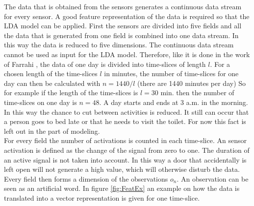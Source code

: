 The data that is obtained from the sensors generates a continuous data stream for every sensor. A good feature representation of the data is required so that the LDA model can be applied. First the sensors are divided into five fields and all the data that is generated from one field is combined into one data stream. In this way the data is reduced to five dimensions. 
The continuous data stream cannot be used as input for the LDA model. Therefore, like it is done in the work of Farrahi \cite{farrahi2008daily}, the data of one day is divided into time-slices of length $l$. For a chosen length of the time-slices $l$ in minutes, the number of time-slices for one day can then be calculated with $n=1440/l$ (there are 1440 minutes per day) So for example if the length of the time-slices is $l=30$ min. then the number of time-slices on one day is $n=48$. A day starts and ends at 3 a.m. in the morning. In this way the chance to cut between activities is reduced. It still can occur that a person goes to bed late or that he needs to visit the toilet. For now this fact is left out in the part of modeling.\\

For every field  the number of activations is counted in each time-slice. An sensor activation is defined as the change of the signal from zero  to one. The duration of an active signal is not taken into account. In this way a door that accidentally is left open will not generate a high value, which will otherwise disturb the data. Every field then forms a dimension of the observations $o_n$. An observation can be seen as an artificial word. In figure \ref{fig:FeatEx} an example on how the data is translated into a vector representation is given for one time-slice.\\

